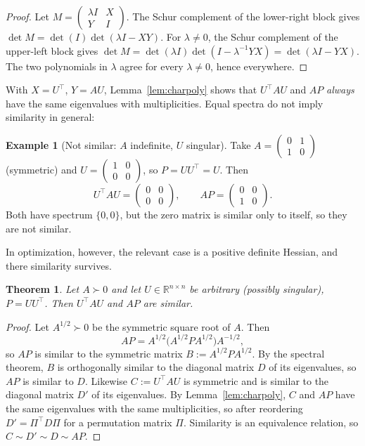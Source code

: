 \documentclass[11pt]{article}
\newtheorem{theorem}{Theorem}
\theoremstyle{remark}
\theoremstyle{definition}
\newtheorem{example}{Example}
\newcommand{\R}{\mathbb{R}}
\begin{document}
\begin{proof}
Let $M=\begin{pmatrix}\lambda I & X\\ Y & I\end{pmatrix}$. The Schur complement of
the lower-right block gives $\det M=\det(I)\det(\lambda I-XY)$. For $\lambda\ne0$,
the Schur complement of the upper-left block gives
$\det M=\det(\lambda I)\det(I-\lambda^{-1}YX)=\det(\lambda I-YX)$. The two
polynomials in $\lambda$ agree for every $\lambda\ne0$, hence everywhere.
\end{proof}

With $X=U^{\top}$, $Y=AU$, Lemma~\ref{lem:charpoly} shows that
$U^{\top}AU$ and $AP$ \emph{always} have the same eigenvalues with
multiplicities. Equal spectra do not imply similarity in general:

\begin{example}[Not similar: $A$ indefinite, $U$ singular]\label{ex:counter}
Take $A=\begin{pmatrix}0&1\\1&0\end{pmatrix}$ (symmetric) and
$U=\begin{pmatrix}1&0\\0&0\end{pmatrix}$, so $P=UU^{\top}=U$. Then
\[
U^{\top}AU=\begin{pmatrix}0&0\\0&0\end{pmatrix},\qquad
AP=\begin{pmatrix}0&0\\1&0\end{pmatrix}.
\]
Both have spectrum $\{0,0\}$, but the zero matrix is similar only to itself,
so they are not similar.
\end{example}

In optimization, however, the relevant case is a positive definite Hessian, and
there similarity survives.

\begin{theorem}\label{thm:psd}
Let $A\succ0$ and let $U\in\R^{n\times n}$ be arbitrary (possibly singular),
$P=UU^{\top}$. Then $U^{\top}AU$ and $AP$ are similar.
\end{theorem}

\begin{proof}
Let $A^{1/2}\succ0$ be the symmetric square root of $A$. Then
\[
AP=A^{1/2}\bigl(A^{1/2}PA^{1/2}\bigr)A^{-1/2},
\]
so $AP$ is similar to the symmetric matrix $B:=A^{1/2}PA^{1/2}$. By the
spectral theorem, $B$ is orthogonally similar to the diagonal matrix
$D$ of its eigenvalues, so $AP$ is similar to $D$. Likewise $C:=U^{\top}AU$ is
symmetric and is similar to the diagonal matrix $D'$ of its eigenvalues. By
Lemma~\ref{lem:charpoly}, $C$ and $AP$ have the same eigenvalues with the same
multiplicities, so after reordering $D'=\Pi^{\top}D\Pi$ for a permutation
matrix $\Pi$. Similarity is an equivalence relation, so
$C\sim D'\sim D\sim AP$.
\end{proof}
\end{document}
